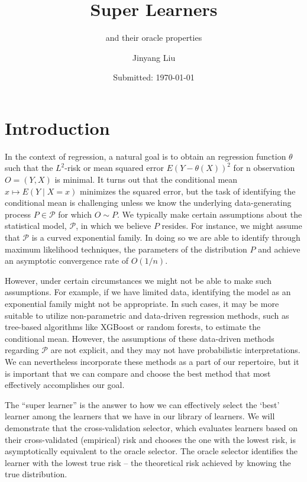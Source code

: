 \documentclass[11pt, a4paper]{article}
\author{Jinyang Liu}
\title{Super Learners}
\subtitle{and their oracle properties}
\date{Submitted: \today}
\theoremstyle{definition}
\theoremstyle{remark}
\begin{document}
\begingroup
    \selectfont
    \maketitle
    \tableofcontents
    \newpage
\endgroup


\section{Introduction}
In the context of regression, a natural goal is to obtain an regression function $ \theta $ such that the $ L^2 $-risk or mean squared error $ E(Y - \theta(X))^2 $ for  n observation $ O = (Y, X) $ is minimal. It turns out that the conditional mean $ x \mapsto E(Y \mid X = x) $ minimizes the squared error, but the task of identifying the conditional mean is challenging unless we know the underlying data-generating process $ P \in \mathcal{P} $ for which $ O \sim P $. We typically make certain assumptions about the statistical model, $\mathcal{P}$, in which we believe $P$ resides. For instance, we might assume that $\mathcal{P}$ is a curved exponential family. In doing so we are able to identify through maximum likelihood techniques, the parameters of the distribution $ P $ and achieve an asymptotic convergence rate of $ O(1/n) $. 

However, under certain circumstances we might not be able to make such assumptions.
For example, if we have limited data, identifying the model as an exponential family might not be appropriate. In such cases, it may be more suitable to utilize non-parametric and data-driven regression methods, such as tree-based algorithms like XGBoost or random forests, to estimate the conditional mean. However, the assumptions of these data-driven methods regarding $ \mathcal{P} $ are not explicit, and they may not have probabilistic interpretations. We can nevertheless incorporate these methods as a part of our repertoire, but it is important that we can compare and choose the best method that most effectively accomplishes our goal. 

The ``super learner'' is the answer to how we can effectively select the `best' learner among the learners that we have in our library of learners. We will demonstrate that the cross-validation selector, which evaluates learners based on their cross-validated (empirical) risk and chooses the one with the lowest risk, is asymptotically equivalent to the oracle selector. The oracle selector identifies the learner with the lowest true risk – the theoretical risk achieved by knowing the true distribution.
\end{document}
